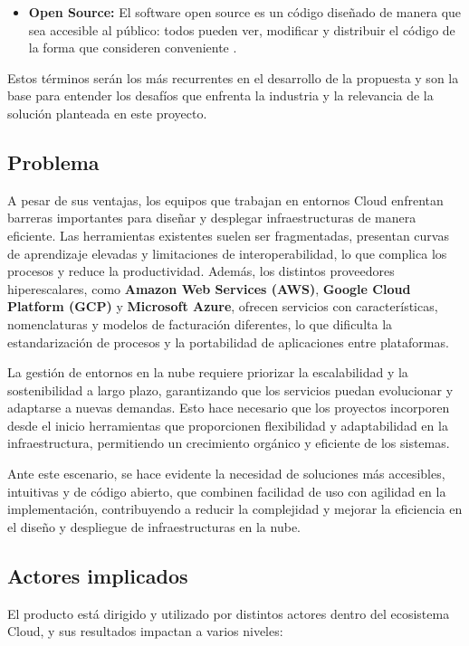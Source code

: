 \documentclass{article}
\begin{document}
{\begin{itemize}
            \item \textbf{Open Source:} El software open source es un código diseñado de manera que sea accesible al público: todos pueden ver, modificar y distribuir el código de la forma que consideren conveniente \cite{noauthor_que_nodate-2}.

            
        \end{itemize}
        
        \justify
        Estos términos serán los más recurrentes en el desarrollo de la propuesta y son la base para entender los desafíos que enfrenta la industria y la relevancia de la solución planteada en este proyecto.

        \subsection{Problema}
        \justify
        A pesar de sus ventajas, los equipos que trabajan en entornos Cloud enfrentan barreras importantes para diseñar y desplegar infraestructuras de manera eficiente. Las herramientas existentes suelen ser fragmentadas, presentan curvas de aprendizaje elevadas y limitaciones de interoperabilidad, lo que complica los procesos y reduce la productividad. Además, los distintos proveedores hiperescalares, como \textbf{Amazon Web Services (AWS)}, \textbf{Google Cloud Platform (GCP)} y \textbf{Microsoft Azure}, ofrecen servicios con características, nomenclaturas y modelos de facturación diferentes, lo que dificulta la estandarización de procesos y la portabilidad de aplicaciones entre plataformas.
        
        \justify
        La gestión de entornos en la nube requiere priorizar la escalabilidad y la sostenibilidad a largo plazo, garantizando que los servicios puedan evolucionar y adaptarse a nuevas demandas. Esto hace necesario que los proyectos incorporen desde el inicio herramientas que proporcionen flexibilidad y adaptabilidad en la infraestructura, permitiendo un crecimiento orgánico y eficiente de los sistemas.
        
        \justify
        Ante este escenario, se hace evidente la necesidad de soluciones más accesibles, intuitivas y de código abierto, que combinen facilidad de uso con agilidad en la implementación, contribuyendo a reducir la complejidad y mejorar la eficiencia en el diseño y despliegue de infraestructuras en la nube.
        \par 

        
        \subsection{Actores implicados}
        \label{sec:actores_implicados}
        \justify
        El producto está dirigido y utilizado por distintos actores dentro del ecosistema Cloud, y sus resultados impactan a varios niveles:
        
}
\end{document}
